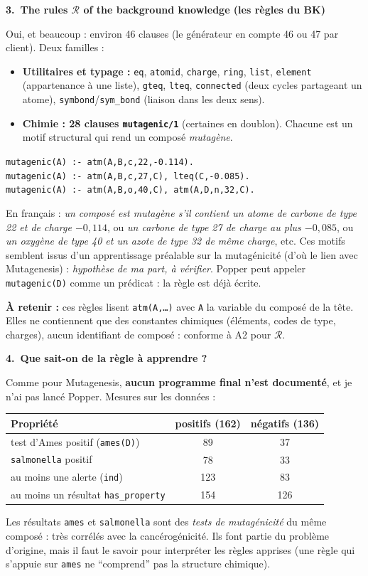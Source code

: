 \documentclass[10pt]{article}
\newcommand{\titrebox}[2]{\needspace{10\baselineskip}\vspace{8pt}
  \begin{tcolorbox}[colback=marine, colframe=marine, arc=0pt, boxrule=0pt,
    top=4pt, bottom=4pt, left=8pt]
  \color{white}\Large\bfseries #1.~#2
  \end{tcolorbox}\vspace{2pt}}
\newcommand{\ce}[1]{\begin{pourquoi}\textbf{\textcolor{marine}{À retenir :}} #1\end{pourquoi}}
\begin{document}
\titrebox{3}{The rules $\mathcal{R}$ of the background knowledge (les règles du BK)}
Oui, et beaucoup : environ 46 clauses (le générateur en compte 46 ou 47 par client). Deux familles :
\begin{itemize}
  \item \textbf{Utilitaires et typage :} \texttt{eq}, \texttt{atomid}, \texttt{charge}, \texttt{ring}, \texttt{list}, \texttt{element} (appartenance à une liste), \texttt{gteq}, \texttt{lteq}, \texttt{connected} (deux cycles partageant un atome), \texttt{symbond}/\texttt{sym\_bond} (liaison dans les deux sens).
  \item \textbf{Chimie : 28 clauses \texttt{mutagenic/1}} (certaines en doublon). Chacune est un motif structural qui rend un composé \emph{mutagène}.
\end{itemize}
\begin{moi}\small
\texttt{mutagenic(A) :- atm(A,B,c,22,-0.114).}\\
\texttt{mutagenic(A) :- atm(A,B,c,27,C), lteq(C,-0.085).}\\
\texttt{mutagenic(A) :- atm(A,B,o,40,C), atm(A,D,n,32,C).}
\end{moi}
En français : \emph{un composé est mutagène s'il contient un atome de carbone de type 22 et de charge $-0{,}114$}, ou \emph{un carbone de type 27 de charge au plus $-0{,}085$}, ou \emph{un oxygène de type 40 et un azote de type 32 de même charge}, etc.
Ces motifs semblent issus d'un apprentissage préalable sur la mutagénicité (d'où le lien avec Mutagenesis) : \emph{hypothèse de ma part, à vérifier}. Popper peut appeler \texttt{mutagenic(D)} comme un prédicat : la règle est déjà écrite.
\ce{ces règles lisent \texttt{atm(A,\ldots)} avec \texttt{A} la variable du composé de la tête. Elles ne contiennent que des constantes chimiques (éléments, codes de type, charges), aucun identifiant de composé : conforme à A2 pour $\mathcal{R}$.}

\titrebox{4}{Que sait-on de la règle à apprendre ?}
Comme pour Mutagenesis, \textbf{aucun programme final n'est documenté}, et je n'ai pas lancé Popper. Mesures sur les données :
\renewcommand{\arraystretch}{1.25}
\begin{center}
\begin{tabular}{@{}L{8.4cm}c c@{}}
\textbf{Propriété} & \textbf{positifs (162)} & \textbf{négatifs (136)}\\\hline
test d'Ames positif (\texttt{ames(D)}) & 89 & 37\\
\texttt{salmonella} positif & 78 & 33\\
au moins une alerte (\texttt{ind}) & 123 & 83\\
au moins un résultat \texttt{has\_property} & 154 & 126\\
\end{tabular}
\end{center}
\begin{piege}
Les résultats \texttt{ames} et \texttt{salmonella} sont des \emph{tests de mutagénicité} du même composé : très corrélés avec la cancérogénicité. Ils font partie du problème d'origine, mais il faut le savoir pour interpréter les règles apprises (une règle qui s'appuie sur \texttt{ames} ne ``comprend'' pas la structure chimique).
\end{piege}
\end{document}
